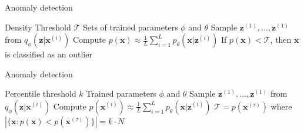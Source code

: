 \documentclass{beamer}
\begin{document}
\begin{frame}{Anomaly detection}  
\begin{algorithm}[H]
	\begin{algorithmic}
		\REQUIRE Density Threshold $\mathcal{T}$
		\REQUIRE Sets of trained parameters $\phi$ and $\theta$
		\STATE Sample $\mathbf{z}^{(1)},...,\mathbf{z}^{(1)}$ from $q_\phi(\mathbf{z}|\mathbf{x}^{(i)})$
		\STATE Compute $p(\mathbf{x})\approx\frac{1}{L}\sum_{i=1}^L p_\theta(\mathbf{x}|\mathbf{z}^{(i)})$
		\STATE If $p(\mathbf{x})<\mathcal{T}$, then $\mathbf{x}$ is classified as an outlier
	\end{algorithmic}
	\caption{Pseudocode for Anomaly detection}
	\label{alg:se}
\end{algorithm}
\end{frame}

\begin{frame}{Anomaly detection}  
\begin{algorithm}[H]
	\begin{algorithmic}
		\REQUIRE Percentile threshold $k$
		\REQUIRE Trained parameters $\phi$ and $\theta$
		\FOR{$i=1$ to $N$}
		\STATE Sample $\mathbf{z}^{(1)},...,\mathbf{z}^{(1)}$ from $q_\phi(\mathbf{z}|\mathbf{x}^{(i)})$
		\STATE Compute $p(\mathbf{x}^{(i)})\approx\frac{1}{L}\sum_{i=1}^L p_\theta(\mathbf{x}|\mathbf{z}^{(i)})$
		\ENDFOR
		\STATE $\mathcal{T}=p(\bm{x}^{(\tau)})$ where $|\{\bm{x} : p(\bm{x}) < p(\bm{x}^{(\tau)})\}|=k\cdot N$
	\end{algorithmic}
	\caption{Pseudocode to find the density threshold}
	\label{alg:se}
\end{algorithm}
\end{frame}
\end{document}
